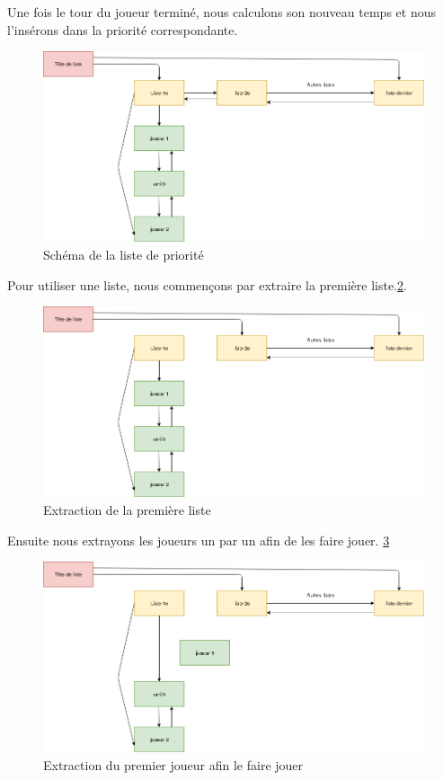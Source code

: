 \documentclass[10pt,a4paper]{article}
\begin{document}
Une fois le tour du joueur terminé, nous calculons son nouveau temps et nous l'insérons dans la priorité correspondante.  

\begin{figure}[!h]
\centering
\includegraphics[width=.8\textwidth]{priorite.png}
\caption{\label{priorite}Schéma de la liste de priorité}
\end{figure}
Pour utiliser une liste, nous commençons par extraire la première liste.\ref{coup1}. 
\begin{figure}[!h]
\centering
\includegraphics[width=.8\textwidth]{coup1.png}
\caption{\label{coup1}Extraction de la première liste}
\end{figure}
Ensuite nous extrayons les joueurs un par un afin de les faire jouer. 
\ref{coupe2}
\begin{figure}[!h]
\centering
\includegraphics[width=.8\textwidth]{coupe2.png}
\caption{\label{coupe2}Extraction du premier joueur afin le faire jouer}
\end{figure}
\end{document}
